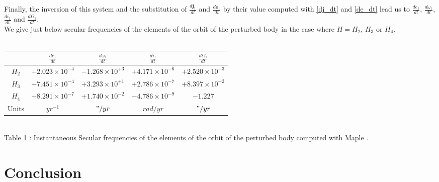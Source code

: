 \documentclass[a4paper]{article}
\begin{document}
Finally, the inversion of this system and the substitution of $\frac{d \mathbf j_{1}}{d t}$ and $\frac{d \mathbf e_{1}}{d t}$ by their value computed with \eqref{dj_dt} and \eqref{de_dt} lead us to $\frac{d e_{1}}{dt}$, $\frac{d \omega_{1}}{dt}$, $\frac{d i_{1}}{dt}$ and $\frac{d \Omega_{1}}{dt}$. \\
We give just below secular frequencies of the elements of the orbit of the perturbed body in the case where $H=H_{2}$, $H_{3}$ or $H_{4}$. \\
\\
{
\renewcommand{\arraystretch}{2}
\begin{tabular}{|c|c|c|c|c|}
\hline
\quad & $\frac{d e_{1}}{dt}$ & $\frac{d \omega_{1}}{dt}$ & $\frac{d i_{1}}{dt}$ & $\frac{d \Omega_{1}}{dt}$ \\
\hline
$H_{2}$ & $+2.023 \times 10^{-4}$ & $-1.268 \times 10^{+3}$ & $+4.171 \times 10^{-6}$ & $+2.520 \times 10^{+3}$ \\
\hline
$H_{3}$ & $-7.451 \times 10^{-4}$ & $+3.293 \times 10^{+1}$ & $+2.786 \times 10^{-7}$ & $+8.397 \times 10^{+2}$ \\
\hline
$H_{4}$ & $+8.291 \times 10^{-7}$ & $+1.740 \times 10^{-2}$ & $-4.786 \times 10^{-9}$ & $-1.227 $ \\
\hline
Units & $yr^{-1}$ & $"/yr$ & $rad/yr$ & $"/yr$ \\
\hline
\end{tabular}
} \\
Table 1 : Instantaneous Secular frequencies of the elements of the orbit of the perturbed body computed with Maple \cite{maple}.

\newpage

\section{Conclusion}
\end{document}
